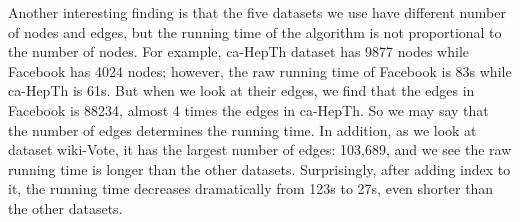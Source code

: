 Another interesting finding is that the five datasets we use have different number of nodes and edges, but the running time of the algorithm is not proportional to the number of nodes. For example, ca-HepTh dataset has 9877 nodes while Facebook has 4024 nodes; however, the raw running time of Facebook is 83s while ca-HepTh is 61s. But when we look at their edges, we find that the edges in Facebook is 88234, almost 4 times the edges in ca-HepTh. So we may say that the number of edges determines the running time. In addition, as we look at dataset wiki-Vote, it has the largest number of edges: 103,689, and we see the raw running time is longer than the other datasets. Surprisingly, after adding index to it, the running time decreases dramatically from 123s to 27s, even shorter than the other datasets. \par
